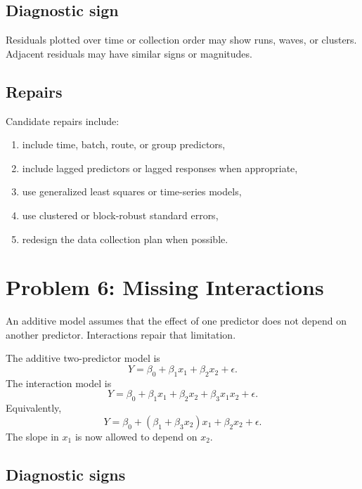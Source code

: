 \subsection*{Diagnostic sign}

Residuals plotted over time or collection order may show runs, waves, or clusters.  Adjacent residuals may have similar signs or magnitudes.

\subsection*{Repairs}

Candidate repairs include:
\begin{enumerate}
  \item include time, batch, route, or group predictors,
  \item include lagged predictors or lagged responses when appropriate,
  \item use generalized least squares or time-series models,
  \item use clustered or block-robust standard errors,
  \item redesign the data collection plan when possible.
\end{enumerate}

\section{Problem 6: Missing Interactions}

An additive model assumes that the effect of one predictor does not depend on another predictor.  Interactions repair that limitation.

The additive two-predictor model is
\begin{equation}
  Y=\beta_0+\beta_1x_1+\beta_2x_2+\epsilon.
\end{equation}
The interaction model is
\begin{equation}
  Y=\beta_0+\beta_1x_1+\beta_2x_2+\beta_3x_1x_2+\epsilon.
\end{equation}
Equivalently,
\begin{equation}
  Y=\beta_0+(\beta_1+\beta_3x_2)x_1+\beta_2x_2+\epsilon.
\end{equation}
The slope in \(x_1\) is now allowed to depend on \(x_2\).

\subsection*{Diagnostic signs}

